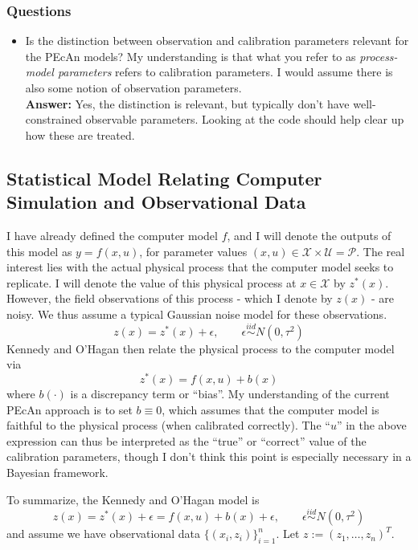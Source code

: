 \documentclass[12pt]{article}
\begin{document}
\subsubsection{Questions}
\begin{itemize}
\item Is the distinction between observation and calibration parameters relevant for the PEcAn models? My understanding is that what you refer to as \textit{process-model parameters}
refers to calibration parameters. I would assume there is also some notion of observation parameters. \\
\textbf{Answer: } Yes, the distinction is relevant, but typically don't have well-constrained observable parameters. Looking at the code should help clear up how these are treated. 
\end{itemize}

\subsection{Statistical Model Relating Computer Simulation and Observational Data}
I have already defined the computer model $f$, and I will denote the outputs of this model as $y = f(x, u)$, for parameter values $(x, u) \in \mathcal{X} \times \mathcal{U} = \mathcal{P}$.
The real interest lies with the actual physical process that the computer model seeks to replicate. I will denote the value of this physical process at $x \in \mathcal{X}$ by $z^*(x)$. 
However, the field observations of this process - which I denote by $z(x)$ - are noisy. We thus assume a typical Gaussian noise model for these observations. 
\[z(x) = z^*(x) + \epsilon, \qquad \epsilon \overset{iid}{\sim} N(0, \tau^2)\]  
Kennedy and O'Hagan then relate the physical process to the computer model via 
\[z^*(x) = f(x, u) + b(x)\]
where $b(\cdot)$ is a discrepancy term or ``bias''. My understanding of the current PEcAn approach is to set $b \equiv 0$, which assumes that the computer model is faithful to the physical
process (when calibrated correctly). The ``$u$'' in the above expression can thus be interpreted as the ``true'' or ``correct''  value of the calibration parameters, though I don't think this 
point is especially necessary in a Bayesian framework. 

To summarize, the Kennedy and O'Hagan model is 
\[z(x) = z^*(x) + \epsilon = f(x, u) + b(x) + \epsilon, \qquad \epsilon \overset{iid}{\sim} N(0, \tau^2)\] 
and assume we have observational data $\{(x_i, z_i)\}_{i = 1}^{n}$. Let $z := (z_1, \dots, z_n)^T$. 
\end{document}
